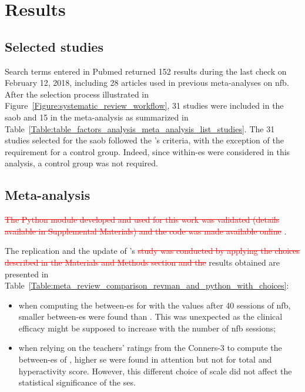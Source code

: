 


\section{Results}

\subsection{Selected studies}

Search terms entered in Pubmed returned 152 results during the last check on February 12, 2018, including 28 
articles used in previous meta-analyses on \gls{nfb}. After the selection process illustrated 
in Figure~\ref{Figure:systematic_review_workflow}, 31 studies were included in the \gls{saob} and 15 in the meta-analysis 
as summarized in Table~\ref{Table:table_factors_analysis_meta_analysis_list_studies}. The 31 studies selected for the \gls{saob} 
followed the \citeauthor{Cortese2016}'s criteria, with the exception of the requirement for a control group. 
Indeed, since within-\gls{es} were considered in this analysis, a control group was not required.

\subsection{Meta-analysis}

\textcolor{red}{\sout{The Python module developed and used for this work was validated (details available in Supplemental Materials) 
and the code was made available online}} \citep{Bussalb2018}.

The replication and the update of \citeauthor{Cortese2016}'s \textcolor{red}{\sout{study was conducted by applying the choices described 
in the Materials and Methods section and the}} results obtained are presented 
in Table~\ref{Table:meta_review_comparison_revman_and_python_with_choices}:

\begin{itemize}
    \item when computing the between-\gls{es} for \citet{Arnold2014} with the values after 40 sessions of \gls{nfb}, 
      smaller between-\gls{es} were found than \citet{Cortese2016}. This was unexpected as  
			the clinical efficacy might be supposed to increase with the number of \gls{nfb} sessions;  
    \item when relying on the teachers' ratings from the Conners-3 to compute the between-\gls{es} of \citet{Steiner2014}, 
		higher \gls{se} were found in attention but not for total and hyperactivity score. However, this different choice of 
		scale did not affect the statistical significance of the \glspl{se}.
\end{itemize}

